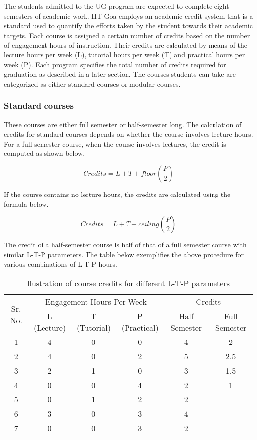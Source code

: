 The students admitted to the UG program are expected to complete eight semesters of academic work. IIT Goa employs an academic credit system that is a standard used to quantify the efforts taken by the student towards their academic targets. Each course is assigned a certain number of credits based on the number of engagement hours of instruction. Their credits are calculated by means of the lecture hours per week (L), tutorial hours per week (T) and practical hours per week (P). Each program specifies the total number of credits required for graduation as described in a later section. The courses students can take are categorized as either standard courses or modular courses.

\subsubsection{Standard courses}

These courses are either full semester or half-semester long. The calculation of credits for standard courses depends on whether the course involves lecture hours. For a full semester course, when the course involves lectures, the credit is computed as shown below.


	\[Credits=L+T+floor(\frac{P}{2})\]


If the course contains no lecture hours, the credits are calculated using the formula below.


	\[Credits=L+T+ceiling(\frac{P}{2})\]


The credit of a half-semester course is half of that of a full semester course with similar L-T-P parameters. The table below exemplifies the above procedure for various combinations of L-T-P hours.


\begin{table}[h!]
    \centering
    \begin{tabular}{c c c c c c}
    \toprule
    \multirow{2}{*}{Sr. No.}   &  \multicolumn{3}{c}{Engagement Hours Per Week} & \multicolumn{2}{c}{Credits}\\
    \cline{2-6}
    {} & L (Lecture) & T (Tutorial) & P (Practical) & Half Semester & Full Semester \\
    \midrule
    1 & 4 & 0 & 0 & 4 & 2   \\
    2 & 4 & 0 & 2 & 5 & 2.5 \\
    3 & 2 & 1 & 0 & 3 & 1.5 \\
    4 & 0 & 0 & 4 & 2 & 1   \\
    5 & 0 & 1 & 2 & 2 & {}  \\
    6 & 3 & 0 & 3 & 4 & {}  \\
    7 & 0 & 0 & 3 & 2 & {} \\
    \bottomrule
    \end{tabular}
    \caption{llustration of course credits for different L-T-P parameters}
    \label{tab:llustration of course credits for different L-T-P parameters}
\end{table}

